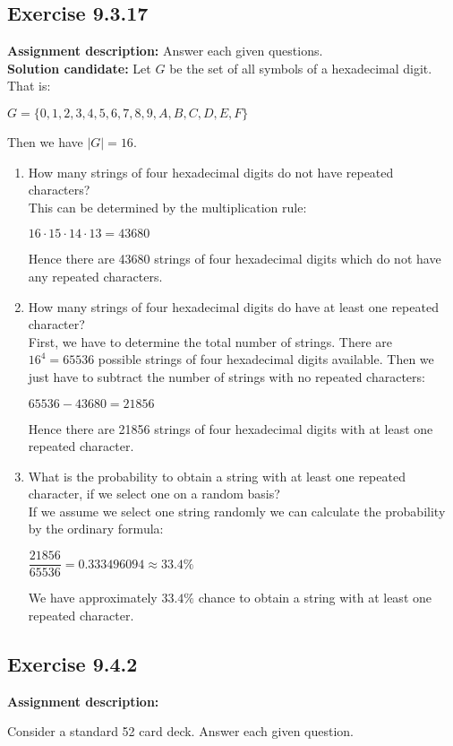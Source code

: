 \documentclass{report}
\newcommand{\cent}[1]{\begin{center}#1\end{center}}
\newcommand{\AssignmentDescription}{\textbf{Assignment description: }}
\newcommand{\Solution}{\textbf{Solution candidate: }}
\newcommand{\Exercise}[1]{\subsection{Exercise #1}}
\newcommand{\defaultEnumerateLabel}{\textbf{\alph*.}}
\newcommand{\MyItem}[1]{\item #1\\}
\newcommand{\LetterEnumeration}[1]{\begin{enumerate}[label = \defaultEnumerateLabel]
		#1
\end{enumerate}}
\begin{document}
 	\Exercise{9.3.17}
 	
 	\AssignmentDescription
 	Answer each given questions.\\
 	
 	\Solution
 	Let $G$ be the set of all symbols of a hexadecimal digit. That is:
 	
 	\cent{$G = \{0,1,2,3,4,5,6,7,8,9,A,B,C,D,E,F\}$}
 	
 	Then we have $|G| = 16$.\\
 	
 	\LetterEnumeration{
 		\MyItem{How many strings of four hexadecimal digits do not have repeated characters?}
		
		This can be determined by the multiplication rule:
		 		
 		$16 \cdot 15 \cdot 14 \cdot 13 = 43680$
 		
 		Hence there are 43680 strings of four hexadecimal digits which do not have any repeated characters.\\
 		
 		\MyItem{How many strings of four hexadecimal digits do have at least one repeated character?}
 		
 		First, we have to determine the total number of strings. There are $16^4 = 65536$  possible strings of four hexadecimal digits available. Then we just have to subtract the number of strings with no repeated characters:
 		
 		\cent{$65536 - 43680 = 21856$}
 		
 		Hence there are 21856 strings of four hexadecimal digits with at least one repeated character.\\
 		
 		\MyItem{What is the probability to obtain a string with at least one repeated character, if we select one on  a random basis?}
 		
 		If we assume we select one string randomly we can calculate the probability by the ordinary formula:
 		
 		\cent{$\dfrac{21856}{65536} = 0.333496094 \approx 33.4\%$}
 		
 		We have approximately $33.4 \%$ chance to obtain a string with at least one repeated character.\\
 		
 	}
 	\Exercise{9.4.2}
 	
 	\AssignmentDescription
 	
 	Consider a standard 52 card deck. Answer each given question.\\
 	
\end{document}
